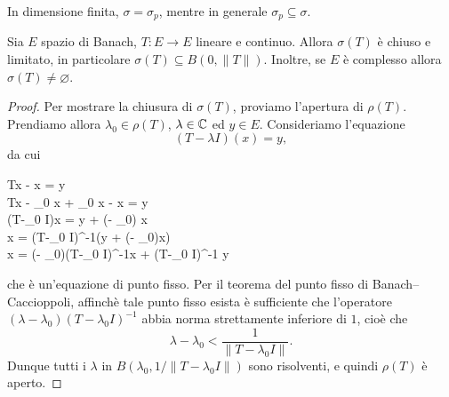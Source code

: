 \begin{remark}
	In dimensione finita, $\sigma = \sigma_p$, mentre in generale $\sigma_p \subseteq \sigma$.
\end{remark}

\begin{theorem}
\label{th:ops_five}
	Sia $E$ spazio di Banach, $T:E \to E$ lineare e continuo.
	Allora $\sigma(T)$ è chiuso e limitato, in particolare $\sigma(T) \subseteq B(0,\|T\|)$.
	Inoltre, se $E$ è complesso allora $\sigma(T) \neq \varnothing$.
\end{theorem}
\begin{proof}
	Per mostrare la chiusura di $\sigma(T)$, proviamo l'apertura di $\rho(T)$.
	Prendiamo allora $\lambda_0 \in \rho(T)$, $\lambda \in \mathbb{C}$ ed $y \in E$. Consideriamo l'equazione
	\begin{equation*}
		(T-\lambda I)(x) = y,
	\end{equation*}
	da cui
	\begin{eqalign*}
		Tx - \lambda x = y\\
		Tx - \lambda_0 x + \lambda_0 x - \lambda x = y\\
		(T-\lambda_0 I)x = y + (\lambda - \lambda_0) x\\
		x = (T-\lambda_0 I)^{-1}(y + (\lambda - \lambda_0)x)\\
		x = (\lambda - \lambda_0)(T-\lambda_0 I)^{-1}x + (T-\lambda_0 I)^{-1} y
	\end{eqalign*}
	che è un'equazione di punto fisso. Per il teorema del punto fisso di Banach--Caccioppoli\footnotemark, affinchè tale punto fisso esista  è sufficiente che l'operatore $(\lambda - \lambda_0)(T-\lambda_0I)^{-1}$ abbia norma strettamente inferiore di $1$, cioè che
	\begin{equation*}
		\lambda - \lambda_0 < \frac1{\|T-\lambda_0I\|}.
	\end{equation*}
	Dunque tutti i $\lambda$ in $B(\lambda_0, 1/\|T-\lambda_0I\|)$ sono risolventi, e quindi $\rho(T)$ è aperto.



\end{proof}
